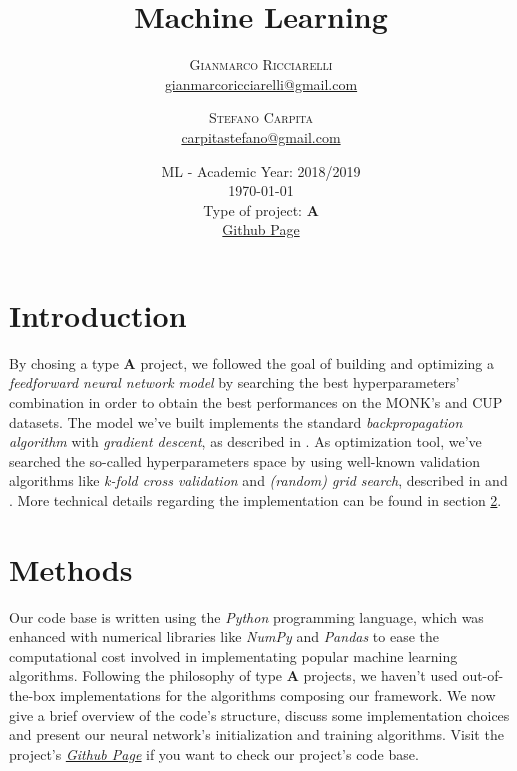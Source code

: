 \documentclass[11pt,twoside]{article}
\title{Machine Learning} %
\author{%
\textsc{Gianmarco Ricciarelli} \\[1ex] %
\normalsize \href{mailto:john@smith.com}{gianmarcoricciarelli@gmail.com} %
\and %
\textsc{Stefano Carpita} \\[1ex] %
\normalsize \href{mailto:jane@smith.com}{carpitastefano@gmail.com} %
}
\date{
    ML - Academic Year: 2018/2019 \\
    {\vspace{0.25cm}}
    \today \\
    {\vspace{0.25cm}}
    Type of project: \textbf{A} \\
    {\vspace{0.25cm}}
    \href{https://github.com/germz01/machinel-learning}{Github Page}
}
\begin{document}
\maketitle


\section{Introduction} %
\label{sec:introduction}
    By chosing a type \textbf{A} project, we followed the goal of building and optimizing a
    \textit{feedforward neural network model} by searching the best hyperparameters' combination in order to
    obtain the best performances on the MONK's and CUP datasets. The model we've built implements the
    standard \textit{backpropagation algorithm} with \textit{gradient descent}, as described in
    \cite{deep_learning}. As optimization tool, we've searched the so-called hyperparameters space by using
    well-known validation algorithms like \textit{k-fold cross validation} and \textit{(random) grid search},
    described in \cite{deep_learning} and \cite{random_search}. More technical details regarding the
    implementation can be found in section \ref{sec:methods}.


\section{Methods} %
\label{sec:methods}
    Our code base is written using the \textit{Python} programming language, which was enhanced with
    numerical libraries like \textit{NumPy} and \textit{Pandas} to ease the computational cost involved in
    implementating popular machine learning algorithms. %
    Following the philosophy of type \textbf{A} projects, we haven't used
    out-of-the-box implementations for the algorithms composing our framework. We now give a brief overview of
    the code's structure, discuss some implementation choices and present our neural network's initialization
    and training algorithms. Visit the project's
    \href{https://github.com/germz01/machinel-learning}{\underline{\textit{Github Page}}} if you want to check
    our project's code base.
\end{document}
